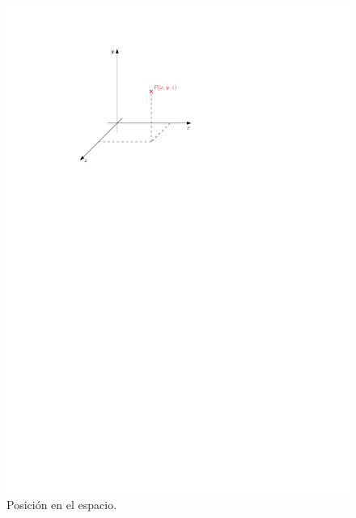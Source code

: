 \begin{figure}[H]
\centering
\begin{minipage}{.45\textwidth}
\center
  \includegraphics[width=.9\textwidth]{img/3d.pdf}
  \caption{Posición en el espacio.}
\end{minipage}%
\hfill
\begin{minipage}{.45\textwidth}
\center

\end{minipage}
\end{figure}
